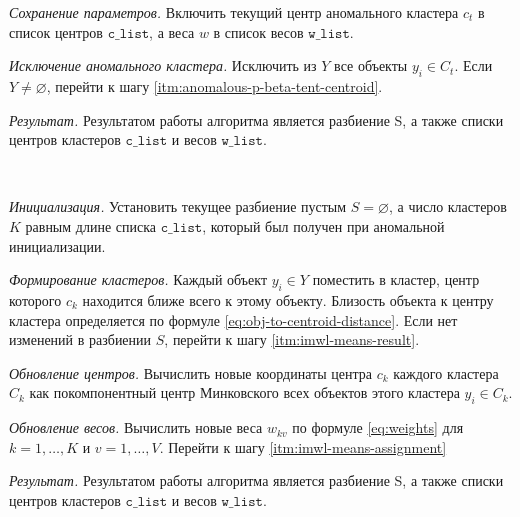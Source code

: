 \documentclass[12pt]{a&t}
\begin{document}
\begin{algorithm}
\begin{enumlist}[.]
		\item \label{itm:anomalous-p-beta-save} \textit{Сохранение параметров.} Включить текущий центр аномального кластера $ c_t $ в список центров $ \mathtt{c\_list} $, а веса $ w $ в список весов $ \mathtt{w\_list} $.
		
		\item \textit{Исключение аномального кластера.} Исключить из $ Y $ все объекты $ y_i \in C_t $. Если $ Y \neq \varnothing $, перейти к шагу \ref{itm:anomalous-p-beta-tent-centroid}.			
		
		\item \textit{ Результат.} Результатом работы алгоритма является разбиение S, а также списки центров кластеров $ \mathtt{c\_list} $ и весов $ \mathtt{w\_list} $.
	\end{enumlist}
\end{algorithm}

\begin{algorithm} \label{alg:imwk-means}
	\
	\begin{enumlist}[.] 
		
		\item \textit{Инициализация.} Установить текущее разбиение пустым $ S=\varnothing $, а число кластеров $ K $ равным длине списка $ \mathtt{c\_list} $, который был получен при аномальной инициализации. 
		
		\item \label{itm:imwl-means-assignment}\textit{Формирование кластеров.} Каждый объект $ y_i \in Y $ поместить в кластер, центр которого $ c_k $ находится ближе всего к этому объекту. Близость объекта к центру кластера определяется  по формуле \ref{eq:obj-to-centroid-distance}. Если нет изменений в разбиении $  S $, перейти к шагу \ref{itm:imwl-means-result}.
		
		\item \textit{Обновление центров.} Вычислить новые координаты центра $ c_k $ каждого кластера $ C_k $ как покомпонентный центр Минковского всех объектов этого кластера $ y_i \in C_k $.
		
		\item \textit{Обновление весов.} Вычислить новые веса $ w_{kv} $ по формуле \ref{eq:weights} для $ k=1,\ldots,K $ и $ v=1,\ldots,V $. Перейти к шагу \ref{itm:imwl-means-assignment}
		
		\item \label{itm:imwl-means-result} \textit{ Результат.} Результатом работы алгоритма является разбиение S, а также списки центров кластеров $ \mathtt{c\_list} $ и весов $ \mathtt{w\_list} $.
	\end{enumlist}
\end{algorithm}
\end{document}
